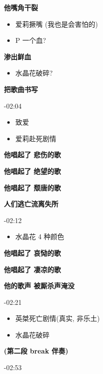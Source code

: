 \documentclass[a4paper]{article}
\begin{document}
\textbf{他嘴角干裂}

\begin{itemize}
    \item 爱莉撅嘴 (我也是会害怕的)
    \item P 一个血?
\end{itemize}

\textbf{渗出鲜血}

\begin{itemize}
    \item 水晶花破碎?
\end{itemize}

\textbf{把歌曲书写}

-02:04

\begin{itemize}
    \item 致爱
    \item 爱莉赴死剧情
\end{itemize}

\textbf{他唱起了 悲伤的歌}

\textbf{他唱起了 绝望的歌}

\textbf{他唱起了 颓唐的歌}

\textbf{人们逃亡流离失所}

-02:12

\begin{itemize}
    \item 水晶花 4 种颜色
\end{itemize}

\textbf{他唱起了 哀恸的歌}

\textbf{他唱起了 凄凉的歌}

\textbf{他的歌声 被厮杀声淹没}

-02:21

\begin{itemize}
    \item 英桀死亡剧情(真实, 非乐土)
    \item 水晶花破碎
\end{itemize}

\textbf{(第二段 break 伴奏)}

-02:53
\end{document}
